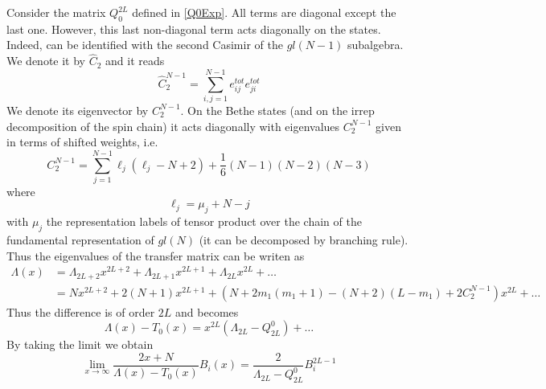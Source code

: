 \documentclass[10pt]{article}
\numberwithin{equation}{section}
\numberwithin{equation}{subsection}
\begin{document}
Consider the matrix $Q_{0}^{2L}$ defined in \eqref{Q0Exp}. All terms are diagonal except the last one. However, this last non-diagonal term acts diagonally on the states. Indeed, can be identified with the second Casimir of the $gl(N-1)$ subalgebra. We denote it by $\hat{C}_{2}$ and it reads
\begin{equation}
\hat C_2^{N-1}= \sum_{i,j=1}^{N-1}e_{ij}^{tot}e_{ji}^{tot}
\end{equation} 
We denote its eigenvector by $C_{2}^{N-1}$. On the Bethe states (and on the irrep decomposition of the spin chain) it acts diagonally with eigenvalues $C_{2}^{N-1}$ given in terms of shifted weights, i.e. 
\begin{equation}
C_2^{N-1}=\sum_{j=1}^{N-1}\ell_j(\ell_j -N+2)+\frac{1}{6}(N-1)(N-2)(N-3)
\end{equation} 
 where 
 \begin{equation}
 	\ell_{j}=\mu_{j}+N-j
 \end{equation}
with $\mu_{j}$ the representation labels of tensor product over the chain of the fundamental representation of $gl(N)$ (it can be decomposed by branching rule).  
Thus the eigenvalues of the transfer matrix can be writen as 
\begin{equation}
\begin{split}
\Lambda(x)&= \Lambda_{2L+2} x^{2L+2}+ \Lambda_{2L+1} x^{2L+1}+ \Lambda_{2L}x^{2L}+\ldots
\\&=N x^{2L+2}+2(N+1) x^{2L+1}+ \left(N+2m_1(m_1+1)-(N+2)(L-m_1)+2C_{2}^{N-1}\right)x^{2L}+\ldots
\end{split}
\end{equation} 
Thus the difference is of order $2L$ and becomes
\begin{equation}
\Lambda(x)-T_0(x)=x^{2L}\left(\Lambda_{2L}-Q_{2L}^0\right)+\ldots
\end{equation} 
By taking the limit we obtain
\begin{equation}
\lim_{x\to\infty}\frac{2x+N}{\Lambda(x)-T_0(x)}B_{i}(x)=\frac{2}{\Lambda_{2L}-Q_{2L}^0}B_i^{2L-1}
\end{equation} 
\end{document}
